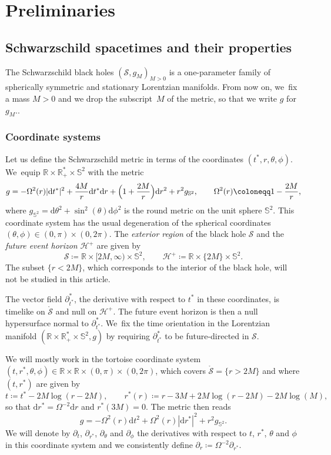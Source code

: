 \documentclass[10pt]{amsart}
\theoremstyle{plain}
\theoremstyle{definition}
\newcommand\R{{\mathbb{R}}}
\newcommand\dr{{\mathrm{d}}}
\begin{document}
\section{Preliminaries}\label{Sec2}

\subsection{Schwarzschild spacetimes and their properties}

The Schwarzschild black holes $(\mathcal{S},g_M)_{M>0}$ is a one-parameter family of spherically symmetric and stationary Lorentzian manifolds. From now on, we~fix a mass $M>0$ and we drop the subscript~$M$ of the metric, so that we write $g$ for $g_M$..

\subsubsection{Coordinate systems}

Let us define the Schwarzschild metric in terms of the coordinates $(t^*,r,\theta,\phi)$. We~equip $\R \times \R_+^* \times \mathbb{S}^2$ with the metric
\[
g=-\Omega^2(r) |\dr t^*|^2+\frac{4M}{r} \dr t^* \dr r+\Bigl(1+\frac{2M}{r}\Bigr)\dr r^2+r^2g_{\mathbb{S}^2},\qquad \Omega^2(r)\coloneqq1-\frac{2M}{r},
\]
where $g_{ \mathbb{S}^2} = \dr \theta^2+\sin^2(\theta) \dr\phi^2$ is the round metric on the unit sphere $\mathbb{S}^2$. This coordinate system has the usual degeneration of the spherical coordinates $(\theta, \phi) \in (0,\pi) \times (0,2\pi)$. The \textit{exterior region} of the black hole $\mathcal{S}$ and the \textit{future event horizon} $\mathcal{H}^+$ are given by
\[
\mathcal{S} \coloneqq \R \times [2M,\infty) \times \mathbb{S}^2,\qquad \mathcal{H}^+ \coloneqq \R \times \{2M\} \times \mathbb{S}^2.
\]
The subset $\{ r < 2M \}$, which corresponds to the interior of the black hole, will not be studied in this article.

The vector field $\partial^*_{t^*}$, the derivative with respect to $t^*$ in these coordinates, is timelike on $\mathring{\mathcal{S}}$ and null on $\mathcal{H}^+$. The future event horizon is then a null hypersurface normal to $\partial^*_{t^*}$. We~fix the time orientation in the Lorentzian manifold $(\R \times \R_+^* \times \mathbb{S}^2,g)$ by requiring $\partial^*_{t^*}$ to be future-directed in $\mathcal{S}$.

We will mostly work in the tortoise coordinate system $(t,r^*,\theta, \phi) \in \R \times \R \times (0,\pi)\times (0,2\pi)$, which covers $\mathring{\mathcal{S}} = \{ r >2M \}$ and where $(t,r^*)$ are given by
\[
t \coloneqq t^*-2M\log (r-2M),\qquad r^*(r)\coloneqq r-3M+2M\log (r-2M)-2M \log(M),
\]
so that $\dr r^*= \Omega^{-2} \dr r$ and $r^*(3M)=0$. The metric then reads
\begin{equation}\label{eq:defmetric}
g=-\Omega^2(r)\mathrm{d} t^2+\Omega^2(r)|\mathrm{d} r^*|^2+r^2 g_{\mathbb{S}^2}.
\end{equation}
We will denote by $\partial_t$, $\partial_{r^*}$, $\partial_\theta$ and $\partial_\phi$ the derivatives with respect to $t$, $r^*$, $\theta$ and $\phi$ in this coordinate system and we consistently define $\partial_r \coloneqq \Omega^{-2} \partial_{r^*}$.
\end{document}
